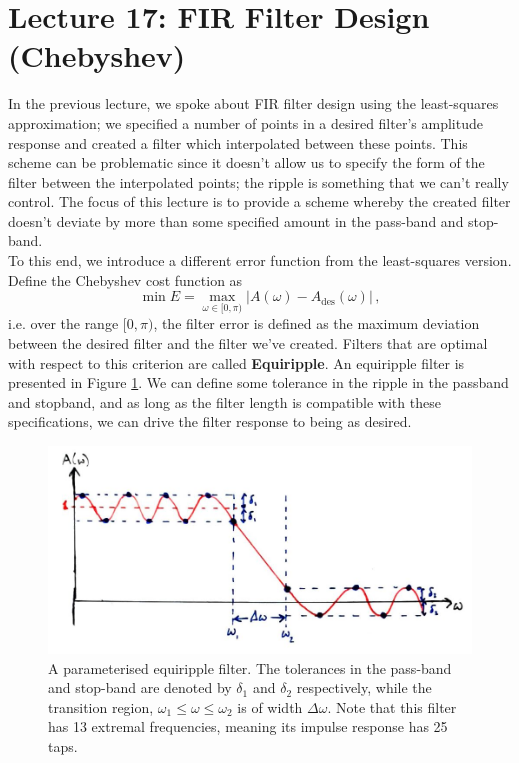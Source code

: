 \section{Lecture 17: FIR Filter Design (Chebyshev)}

In the previous lecture, we spoke about FIR filter design using the
least-squares approximation; we specified a number of points in
a desired filter's amplitude response and created a filter which
interpolated between these points. This scheme can be problematic
since it doesn't allow us to specify the form of the filter
between the interpolated points; the ripple is something that we
can't really control. The focus of this lecture is to provide a
scheme whereby the created filter doesn't deviate by more than
some specified amount in the pass-band and stop-band.\\
%
To this end, we introduce a different error function from the
least-squares version. Define the Chebyshev cost function as
%
\begin{displaymath}
  \min E = \max_{\omega\in[0,\pi)} \lvert A(\omega) - A_\mathrm{des}(\omega)\rvert \,,
\end{displaymath}
%
i.e. over the range $[0,\pi)$, the filter error is defined as the
maximum deviation between the desired filter and the filter we've
created. Filters that are optimal with respect to this criterion
are called \textbf{Equiripple}. An equiripple filter is presented
in Figure \ref{fig::lecture_17_equiripple}. We can define some
tolerance in the ripple in the
passband and stopband, and as long as the filter length is
compatible with these specifications, we can drive the filter
response to being as desired.\\
%
\begin{figure}[!htb]
  \includegraphics[width=\textwidth]{images/lecture_17_equiripple.JPG}
  \caption{A parameterised equiripple filter. The tolerances in the
    pass-band and stop-band are denoted by $\delta_1$ and $\delta_2$
    respectively, while the transition region, $\omega_1\leq\omega\leq\omega_2$
    is of width $\Delta\omega$. Note that this filter has 13
    extremal frequencies, meaning its impulse response has 25 taps.
  }
  \label{fig::lecture_17_equiripple}
\end{figure}
